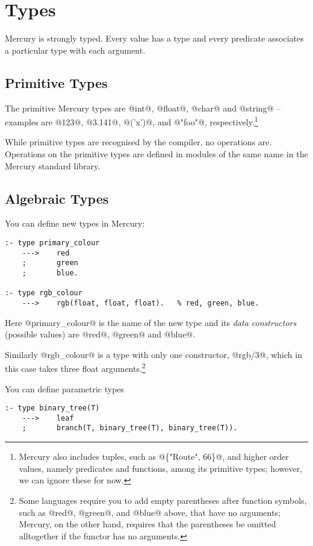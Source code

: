 
\chapter{Types}

Mercury is strongly typed.  Every value has a type and every
predicate associates a particular type with each argument.

\section{Primitive Types}

The primitive Mercury types are @int@, @float@, @char@ and @string@ --
examples are @123@, @3.141@, @('x')@, and @"foo"@,
respectively.\footnote{Mercury also includes tuples, such as @\{"Route",
66\}@, and higher order values, namely predicates and functions, among
its primitive types; however, we can ignore these for now.}

While primitive types are recognised by the compiler, no
operations are.  Operations on the primitive types are defined in
modules of the same name in the Mercury standard library.

\section{Algebraic Types}

You can define new types in Mercury:
\begin{verbatim}
:- type primary_colour
    --->    red
    ;       green
    ;       blue.

:- type rgb_colour
    --->    rgb(float, float, float).   % red, green, blue.
\end{verbatim}

Here @primary_colour@ is the name of the new type and its
\emph{data constructors} (possible values) are @red@, @green@ and @blue@.

Similarly @rgb_colour@ is a type with only one constructor,
@rgb/3@, which in this case takes three float arguments.\footnote{Some languages require you to add empty parentheses
after function symbols, such as @red@, @green@, and @blue@ above,
that have no arguments; Mercury, on the other hand, requires
that the parentheses be omitted alltogether if the functor has
no arguments.}

You can define parametric types
\begin{verbatim}
:- type binary_tree(T)
    --->    leaf
    ;       branch(T, binary_tree(T), binary_tree(T)).
\end{verbatim}

